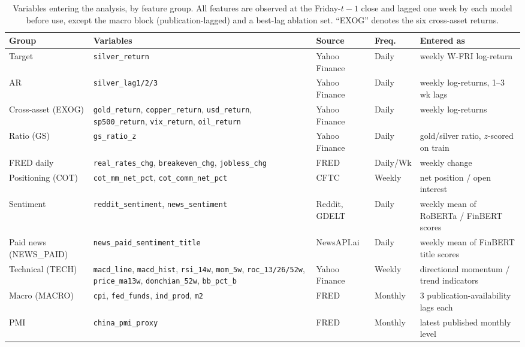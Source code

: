 \documentclass[12pt, a4paper]{article}
\begin{document}
\begin{table}[H]
    \centering
    \small
    \caption{Variables entering the analysis, by feature group. All features are observed
    at the Friday-\(t{-}1\) close and lagged one week by each model before use, except the
    macro block (publication-lagged) and a best-lag ablation set. ``EXOG'' denotes
    the six cross-asset returns.}
    \label{tab:variables}
    \setlength{\tabcolsep}{4.5pt}
    \begin{tabular}{p{1.9cm} p{4.7cm} l l p{2.8cm}}
        \toprule
        Group & Variables & Source & Freq.\ & Entered as \\
        \midrule
        Target        & \texttt{silver\_return} & Yahoo Finance & Daily & weekly W-FRI log-return \\
        AR            & \texttt{silver\_lag1/2/3} & Yahoo Finance & Daily & weekly log-returns, 1--3 wk lags \\
        Cross-asset (EXOG) & \texttt{gold\_return}, \texttt{copper\_return}, \texttt{usd\_return}, \texttt{sp500\_return}, \texttt{vix\_return}, \texttt{oil\_return} & Yahoo Finance & Daily & weekly log-returns \\
        Ratio (GS)    & \texttt{gs\_ratio\_z} & Yahoo Finance & Daily & gold/silver ratio, \(z\)-scored on train \\
        FRED daily    & \texttt{real\_rates\_chg}, \texttt{breakeven\_chg}, \texttt{jobless\_chg} & FRED & Daily/Wk & weekly change \\
        Positioning (COT) & \texttt{cot\_mm\_net\_pct}, \texttt{cot\_comm\_net\_pct} & CFTC & Weekly & net position / open interest \\
        Sentiment     & \texttt{reddit\_sentiment}, \texttt{news\_sentiment} & Reddit, GDELT & Daily & weekly mean of RoBERTa / FinBERT scores \\
        Paid news (NEWS\_PAID) & \texttt{news\_paid\_sentiment\_title} & NewsAPI.ai & Daily & weekly mean of FinBERT title scores \\
        Technical (TECH) & \texttt{macd\_line}, \texttt{macd\_hist}, \texttt{rsi\_14w}, \texttt{mom\_5w}, \texttt{roc\_13/26/52w}, \texttt{price\_ma13w}, \texttt{donchian\_52w}, \texttt{bb\_pct\_b} & Yahoo Finance & Weekly & directional momentum / trend indicators \\
        Macro (MACRO) & \texttt{cpi}, \texttt{fed\_funds}, \texttt{ind\_prod}, \texttt{m2} & FRED & Monthly & 3 publication-availability lags each \\
        PMI           & \texttt{china\_pmi\_proxy} & FRED & Monthly & latest published monthly level \\
        \bottomrule
    \end{tabular}
\end{table}
\end{document}
